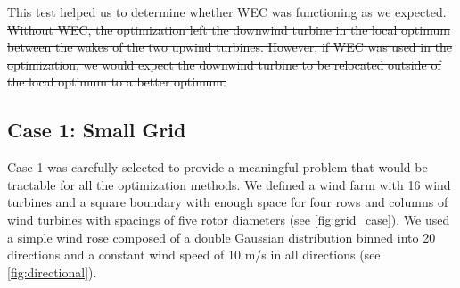 \documentclass[a4paper]{jpconf}
\providecommand{\DIFdel}[1]{{\protect\color{red}\sout{#1}}}                      %
\providecommand{\DIFdelend}{} %
\DeclareRobustCommand{\DIFdelend}{\DIFOaddend \let\includegraphics\DIFOincludegraphics} %
\begin{document}
\DIFdel{This test helped us to determine whether WEC was functioning as we expected. Without WEC, the optimization left the downwind turbine in the local optimum between the wakes of the two upwind turbines. However, if WEC was used in the optimization, we would expect the downwind turbine to be relocated outside of the local optimum to a better optimum.
}%

\DIFdelend \subsection{Case 1: Small Grid}
Case 1 was carefully selected to provide a meaningful problem that would be tractable for all the optimization methods. We defined a wind farm with 16 wind turbines and a square boundary with enough space for four rows and columns of wind turbines with spacings of five rotor diameters (see \cref{fig:grid_case}). We used a simple wind rose composed of a double Gaussian distribution binned into 20 directions and a constant wind speed of 10 m/s in all directions (see \cref{fig:directional}).
\end{document}
